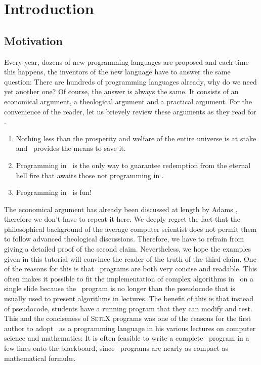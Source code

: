 \chapter{Introduction}

\section{Motivation}
Every year, dozens of new programming languages are proposed and each time this
happens,  the inventors of the new language have to answer the same question: 
There are hundreds of programming languages already, why do we need yet another one?  
Of course, the answer is always the same.  It consists of an economical argument, a
theological argument and a practical argument. For the
convenience of the reader, let us brievely review these arguments as they read for \setlx.  
\begin{enumerate}
\item Nothing less than the prosperity and welfare of the entire universe is at
      stake and \setlx\ provides the means to save it.
\item Programming in \setlx\ is the only way to guarantee redemption from 
      the eternal hell fire that awaits those not programming in \setlx.
\item Programming in \setlx\ is fun!
\end{enumerate}
The economical argument has already been discussed at length by Adams \cite{adams:1980},
therefore we don't have to repeat it here.   We deeply
regret the fact that the philosophical background of the average computer scientist does not permit
them to follow advanced theological discussions.  Therefore, we have to refrain from giving a
detailed proof of the second claim.  Nevertheless, we hope the examples given in this
tutorial will convince the reader of the truth of the third claim.
  One of the reasons for this is that \setlx\ programs are both very concise and
readable.  This often makes it possible to fit the implementation of complex algorithms in \setlx\ on a
single slide because the \setlx\ program is no longer than the pseudocode that is usually used to
present algorithms in lectures.  The benefit of this is that instead of pseudocode, students have a
running program that they can modify and test. This and the
conciseness of \textsc{SetlX} programs was one of the reasons for
the first author to adopt \setlx\ as a programming language in his various lectures on computer
science and mathematics: It is often feasible to write a complete \setlx\ program in a few lines 
onto the blackboard, since \setlx\ programs are nearly as compact as mathematical formul\ae.


